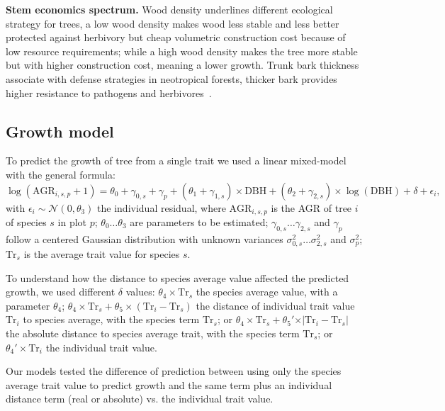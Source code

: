 \textbf{Stem economics spectrum.} Wood density underlines different ecological strategy for trees, a low wood density makes wood less stable and less better protected against herbivory but cheap volumetric construction cost because of low resource requirements; while a high wood density makes the tree more stable but with higher construction cost, meaning a lower growth. Trunk bark thickness associate with defense strategies in neotropical forests, thicker bark provides higher resistance to pathogens and herbivores~\cite{NEEDED}.


\subsection*{Growth model}

To predict the growth of tree from a single trait we used a linear mixed-model with the general formula:
\begin{equation}
	\label{eq:growth_mod}
	\log(\text{AGR}_{i, s, p} + 1) = \theta_0 + \gamma_{0, s} + \gamma_p
		+ (\theta_1 + \gamma_{1, s}) \times \text{DBH}
		+ (\theta_2 + \gamma_{2, s}) \times \log(\text{DBH})
		+ \delta
		+ \epsilon_i,
\end{equation}
with $\epsilon_i \sim \mathcal{N}(0, \theta_3)$ the individual residual,
where $\text{AGR}_{i, s, p}$ is the AGR of tree $i$ of species $s$ in plot $p$; $\theta_0 \ldots \theta_3$ are parameters to be estimated; $\gamma_{0, s} \ldots \gamma_{2, s}$ and $\gamma_p$ follow a centered Gaussian distribution with unknown variances $\sigma^2_{0, s} \ldots \sigma^2_{2, s}$ and $\sigma^2_p$; $\text{Tr}_s$ is the average trait value for species $s$.

To understand how the distance to species average value affected the predicted growth, we used different $\delta$ values: $\theta_4 \times \text{Tr}_s$ the species average value, with a parameter $\theta_4$; $\theta_4 \times \text{Tr}_s + \theta_5 \times(\text{Tr}_i - \text{Tr}_s)$ the distance of individual trait value $\text{Tr}_i$ to species average, with the species term $\text{Tr}_s$; or $\theta_4 \times \text{Tr}_s + \theta_5' \times \vert \text{Tr}_i - \text{Tr}_s \vert$ the absolute distance to species average trait, with the species term $\text{Tr}_s$; or $\theta_4' \times \text{Tr}_i$ the individual trait value.

Our models tested the difference of prediction between using only the species average trait value to predict growth and the same term plus an individual distance term (real or absolute) vs. the individual trait value.

